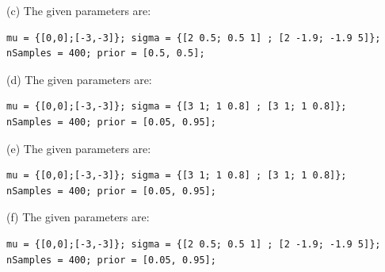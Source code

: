 \documentclass[12pt]{article}
\begin{document}
\noindent (c) The given parameters are:
\begin{lstlisting}
mu = {[0,0];[-3,-3]}; sigma = {[2 0.5; 0.5 1] ; [2 -1.9; -1.9 5]};
nSamples = 400; prior = [0.5, 0.5];
\end{lstlisting}

\noindent (d) The given parameters are:
\begin{lstlisting}
mu = {[0,0];[-3,-3]}; sigma = {[3 1; 1 0.8] ; [3 1; 1 0.8]};
nSamples = 400; prior = [0.05, 0.95];
\end{lstlisting}


\noindent (e) The given parameters are:
\begin{lstlisting}
mu = {[0,0];[-3,-3]}; sigma = {[3 1; 1 0.8] ; [3 1; 1 0.8]};
nSamples = 400; prior = [0.05, 0.95];
\end{lstlisting}

\noindent (f) The given parameters are:
\begin{lstlisting}
mu = {[0,0];[-3,-3]}; sigma = {[2 0.5; 0.5 1] ; [2 -1.9; -1.9 5]};
nSamples = 400; prior = [0.05, 0.95];
\end{lstlisting}
\end{document}
